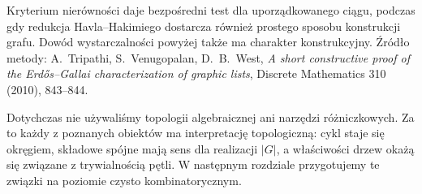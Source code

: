 \begin{uwaga}
Kryterium nierówności daje bezpośredni test dla
uporządkowanego ciągu, podczas gdy redukcja
Havla--Hakimiego dostarcza również prostego sposobu
konstrukcji grafu. Dowód wystarczalności powyżej także
ma charakter konstrukcyjny. Źródło metody:
A.~Tripathi, S.~Venugopalan, D.~B.~West,
\emph{A short constructive proof of the Erdős--Gallai
characterization of graphic lists}, Discrete Mathematics
310 (2010), 843--844.
\end{uwaga}

\begin{uwaga}
Dotychczas nie używaliśmy topologii algebraicznej ani
narzędzi różniczkowych. Za to każdy z poznanych obiektów
ma interpretację topologiczną: cykl staje się okręgiem,
składowe spójne mają sens dla realizacji $|G|$, a
właściwości drzew okażą się związane z trywialnością
pętli. W następnym rozdziale przygotujemy te związki
na poziomie czysto kombinatorycznym.
\end{uwaga}

